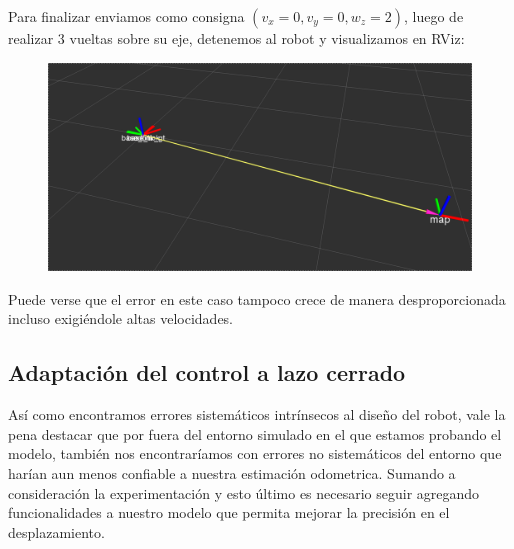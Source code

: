 \pagebreak

Para finalizar enviamos como consigna $(v_x = 0, v_y=0,w_z=2)$, luego de realizar 3 vueltas sobre su eje, detenemos al robot y visualizamos en RViz:

\begin{center}
\begin{figure}[!htb]
\includegraphics[width=\linewidth]{pruebasOdom/3Vueltas2Vel.png}
\end{figure}
\FloatBarrier
\end{center}
Puede verse que el error en este caso tampoco crece de manera desproporcionada incluso exigiéndole altas velocidades.



\subsection{Adaptación del control a lazo cerrado}

Así como encontramos errores sistemáticos intrínsecos al diseño del robot, vale la pena destacar que por fuera del entorno simulado en el que estamos probando el modelo, también nos encontraríamos con errores no sistemáticos del entorno que harían aun menos confiable a nuestra estimación odometrica. Sumando a consideración la experimentación y esto último es necesario seguir agregando funcionalidades a nuestro modelo que permita mejorar la precisión en el desplazamiento. 

